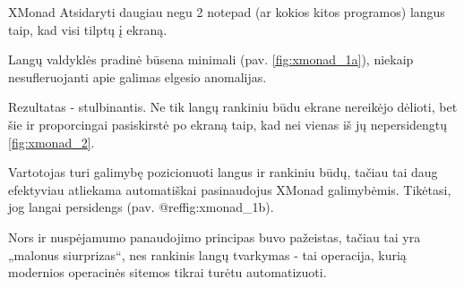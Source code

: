 \begin{xcase}{XMonad}
  \xcgoal
  {
    Atsidaryti daugiau negu 2 notepad (ar kokios kitos programos) langus taip, kad visi 
    tilptų į ekraną.
  }
  
  \xctools
  {
    Langų valdyklės pradinė būsena minimali (pav. \ref{fig:xmonad_1a}), niekaip nesufleruojanti apie galimas elgesio
    anomalijas.
    {
    }
  }
  
  \xcresult
  {
    Rezultatas - stulbinantis. Ne tik langų rankiniu būdu ekrane nereikėjo dėlioti, bet šie
    ir proporcingai pasiskirstė po ekraną taip, kad nei vienas iš jų nepersidengtų \ref{fig:xmonad_2}.
  }
  
  \xcprinciples
  {
    {
      Vartotojas turi galimybę pozicionuoti langus ir rankiniu būdų, tačiau tai daug efektyviau
      atliekama automatiškai pasinaudojus XMonad galimybėmis.
    }
    {
      Tikėtasi, jog langai persidengs (pav. @ref{fig:xmonad_1b}).
    }
  }
  
  \xcthoughts
  {
    Nors ir nuspėjamumo panaudojimo principas buvo pažeistas, tačiau tai yra „malonus 
    siurprizas“, nes rankinis langų tvarkymas - tai operacija, kurią modernios operacinės
    sitemos tikrai turėtu automatizuoti.
  }
\end{xcase}
